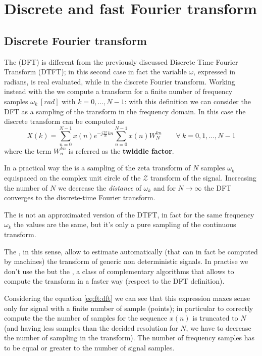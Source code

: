 \chapter{Discrete and fast Fourier transform}
\section{Discrete Fourier transform}
	The  (DFT) is different from the previously discussed Discrete Time Fourier Transform (DTFT); in this second case in fact the variable $\omega$, expressed in radians, is real evaluated, while in the discrete Fourier transform. Working instead with the \dft we compute a transform for a finite number of frequency samples $\omega_k \ [rad]$ with $k=0,\dots, N-1$: with this definition we can consider the DFT as a sampling of the transform in the frequency domain. In this case the discrete transform can be computed as
	\begin{equation} \label{eq:ft:dft}
		X(k) = \sum_{n=0}^{N-1} x(n) e^{-j \frac{2\pi}{N}kn} \sum_{n=0}^{N-1} x(n) W_N^{kn} \qquad \forall \ k = 0,1,\dots, N-1
	\end{equation}
	where the term $W_n^{kn}$ is referred as the \textbf{twiddle factor}.
	
	In a practical way the \dft is a sampling of the zeta transform of $N$ samples $\omega_k$ equispaced on the complex unit circle of the $\mathscr Z$ transform of the signal. Increasing the number of $N$ we decrease the \textit{distance} of $\omega_k$ and for $N\rightarrow\infty$ the DFT converges to the discrete-time Fourier transform.
	
	The \dft is not an approximated version of the DTFT, in fact for the same frequency $\omega_k$ the values are the same, but it's only a pure sampling of the continuous transform. \vspace{3mm}
	
	The \dft, in this sense, allow to estimate automatically (that can in fact be computed by machines) the transform of generic non deterministic signals. In practise we don't use the \dft but the , a class of complementary algorithms that allows to compute the transform in a faster way (respect to the DFT definition). \vspace{3mm}
	
	Considering the equation \ref{eq:ft:dft} we can see that this expression maxes sense only for signal with a finite number of sample (points); in particular to correctly compute the \dft the number of samples for the sequence $x(n)$ is truncated to $N$ (and having less samples than the decided resolution for $N$, we have to decrease the number of sampling in the transform). The number of frequency samples has to be equal or greater to the number of signal samples.
	
